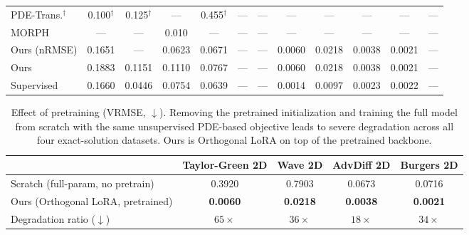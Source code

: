 \documentclass{article}
\begin{document}
\begin{table}[t]
{\begin{tabular}{l cccc ccccccc}
PDE-Trans.$^\dagger$ & 0.100$^\dagger$ & 0.125$^\dagger$ & ---          & 0.455$^\dagger$ & --- & --- & --- & ---             & ---             & ---    & --- \\
MORPH            & ---             & ---             & 0.010           & ---             & --- & --- & --- & ---             & ---             & ---    & --- \\
\midrule
Ours (nRMSE)     & 0.1651          & ---             & 0.0623          & 0.0671          & --- & --- & 0.0060 & 0.0218 & 0.0038 & 0.0021 & --- \\
Ours             & 0.1883          & 0.1151          & 0.1110          & 0.0767          & --- & --- & 0.0060 & 0.0218 & 0.0038 & 0.0021 & --- \\
Supervised       & 0.1660          & 0.0446          & 0.0754          & 0.0639          & --- & --- & 0.0014 & 0.0097 & 0.0023 & 0.0022 & --- \\
\bottomrule
\end{tabular}%
}
\end{table}

\begin{table}[t]
\centering
\caption{Effect of pretraining (VRMSE, $\downarrow$). Removing the pretrained initialization and training the full model from scratch with the same unsupervised PDE-based objective leads to severe degradation across all four exact-solution datasets. Ours is Orthogonal LoRA on top of the pretrained backbone.}
\label{tab:ablation_pretrain}
\begin{tabular}{lcccc}
\toprule
& Taylor-Green 2D & Wave 2D & AdvDiff 2D & Burgers 2D \\
\midrule
Scratch (full-param, no pretrain) & 0.3920 & 0.7903 & 0.0673 & 0.0716 \\
Ours (Orthogonal LoRA, pretrained) & \textbf{0.0060} & \textbf{0.0218} & \textbf{0.0038} & \textbf{0.0021} \\
\midrule
Degradation ratio ($\downarrow$) & $65\times$ & $36\times$ & $18\times$ & $34\times$ \\
\bottomrule
\end{tabular}
\end{table}
\end{document}
